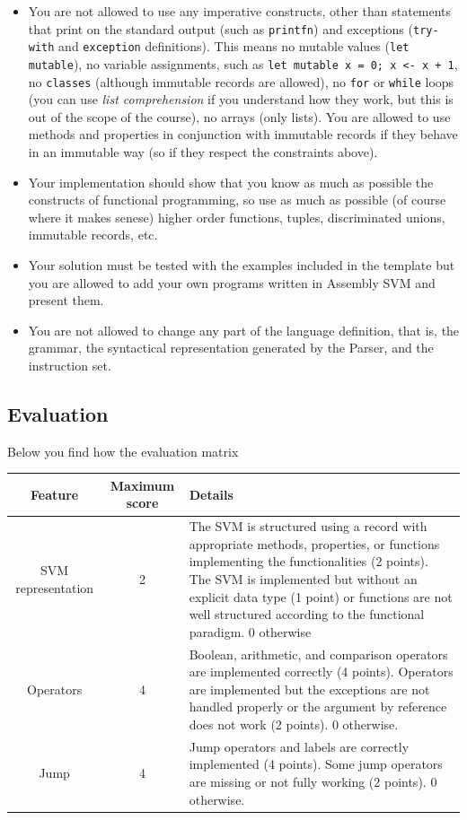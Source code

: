 \begin{itemize}
	\item You are not allowed to use any imperative constructs, other than statements that print on the standard output (such as \texttt{printfn}) and exceptions (\texttt{try-with} and \texttt{exception} definitions). This means no mutable values (\texttt{let mutable}), no variable assignments, such as \texttt{let mutable x = 0; x <- x + 1}, no \texttt{classes} (although immutable records are allowed), no \texttt{for} or \texttt{while} loops (you can use \textit{list comprehension} if you understand how they work, but this is out of the scope of the course), no arrays (only lists). You are allowed to use methods and properties in conjunction with  immutable records if they behave in an immutable way (so if they respect the constraints above).
	\item Your implementation should show that you know as much as possible the constructs of functional programming, so use as much as possible (of course where it makes senese) higher order functions, tuples, discriminated unions, immutable records, etc.
	\item Your solution must be tested with the examples included in the template but you are allowed to add your own programs written in Assembly SVM and present them.
	\item You are not allowed to change any part of the language definition, that is, the grammar, the syntactical representation generated by the Parser, and the instruction set.
\end{itemize}

\subsection{Evaluation}
Below you find how the evaluation matrix

\begin{longtable}{|c|c|p{8cm}|}
	\hline
	\textbf{Feature} & Maximum score & Details \\
	\hline
	SVM representation & 2 & The SVM is structured using a record with appropriate methods, properties, or functions implementing the functionalities (2 points). The SVM is implemented but without an explicit data type (1 point) or functions are not well structured according to the functional paradigm. 0 otherwise \\
	\hline
	Operators & 4 & Boolean, arithmetic, and comparison operators are implemented correctly (4 points). Operators are implemented but the exceptions are not handled properly or the argument by reference does not work (2 points). 0 otherwise. \\
	\hline
	Jump & 4 & Jump operators and labels are correctly implemented (4 points). Some jump operators are missing or not fully working (2 points). 0 otherwise. \\
	\hline  
\end{longtable}